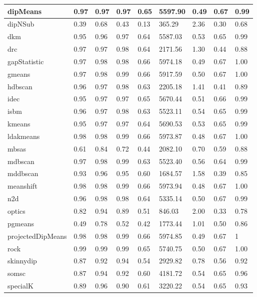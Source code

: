 \begin{table}[H]
\begin{tabular}{|l|l|l|l|l|l|l|l|l|}
\hline
dipMeans & 0.97 & 0.97 & 0.97 & 0.65 & 5597.90 & 0.49 & 0.67 & 0.99 \\
\hline
dipNSub & 0.39 & 0.68 & 0.43 & 0.13 & 365.29 & 2.36 & 0.30 & 0.68 \\
\hline
dkm & 0.95 & 0.96 & 0.97 & 0.64 & 5587.03 & 0.53 & 0.65 & 0.99 \\
\hline
drc & 0.97 & 0.97 & 0.98 & 0.64 & 2171.56 & 1.30 & 0.44 & 0.88 \\
\hline
gapStatistic & 0.97 & 0.98 & 0.98 & 0.66 & 5974.18 & 0.49 & 0.67 & 1.00 \\
\hline
gmeans & 0.97 & 0.98 & 0.99 & 0.66 & 5917.59 & 0.50 & 0.67 & 1.00 \\
\hline
hdbscan & 0.96 & 0.97 & 0.98 & 0.63 & 2205.18 & 1.41 & 0.41 & 0.89 \\
\hline
idec & 0.95 & 0.97 & 0.97 & 0.65 & 5670.44 & 0.51 & 0.66 & 0.99 \\
\hline
isbm & 0.96 & 0.97 & 0.98 & 0.63 & 5523.11 & 0.54 & 0.65 & 0.99 \\
\hline
kmeans & 0.95 & 0.97 & 0.97 & 0.64 & 5690.53 & 0.53 & 0.65 & 0.99 \\
\hline
ldakmeans & 0.98 & 0.98 & 0.99 & 0.66 & 5973.87 & 0.48 & 0.67 & 1.00 \\
\hline
mbsas & 0.61 & 0.84 & 0.72 & 0.44 & 2082.10 & 0.70 & 0.59 & 0.88 \\
\hline
mdbscan & 0.97 & 0.98 & 0.99 & 0.63 & 5523.40 & 0.56 & 0.64 & 0.99 \\
\hline
mddbscan & 0.93 & 0.96 & 0.95 & 0.60 & 1684.57 & 1.58 & 0.39 & 0.85 \\
\hline
meanshift & 0.98 & 0.98 & 0.99 & 0.66 & 5973.94 & 0.48 & 0.67 & 1.00 \\
\hline
n2d & 0.96 & 0.98 & 0.98 & 0.64 & 5335.14 & 0.50 & 0.67 & 0.99 \\
\hline
optics & 0.82 & 0.94 & 0.89 & 0.51 & 846.03 & 2.00 & 0.33 & 0.78 \\
\hline
pgmeans & 0.49 & 0.78 & 0.52 & 0.42 & 1773.44 & 1.01 & 0.50 & 0.86 \\
\hline
projectedDipMeans & 0.98 & 0.98 & 0.99 & 0.66 & 5974.85 & 0.49 & 0.67 & 1 \\
\hline
rock & 0.99 & 0.99 & 0.99 & 0.65 & 5740.75 & 0.50 & 0.67 & 1.00 \\
\hline
skinnydip & 0.87 & 0.92 & 0.94 & 0.54 & 2929.82 & 0.78 & 0.56 & 0.92 \\
\hline
somsc & 0.87 & 0.94 & 0.92 & 0.60 & 4181.72 & 0.54 & 0.65 & 0.96 \\
\hline
specialK & 0.89 & 0.96 & 0.90 & 0.61 & 3220.22 & 0.54 & 0.65 & 0.93 \\

\end{tabular}
\end{table}
